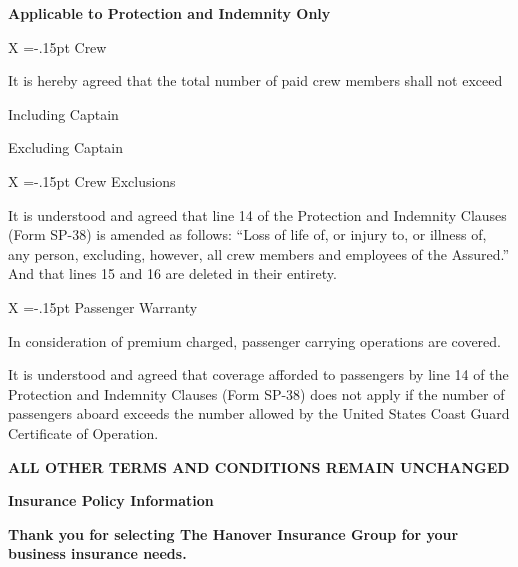 \documentclass[10pt]{article}
\newcommand{\remainunchanged} {
\mbox{}
\vfill
\begin{center}
  {\Large \textbf{ALL OTHER TERMS AND CONDITIONS REMAIN UNCHANGED}}
\end{center}
}
\newcommand{\mybox}{\fboxsep=-.15pt\fbox{\rule{0pt}{2.5ex}\rule{2.5ex}{0pt}}}
\newcommand{\checkbox}[2]{%
    \ifthenelse{\equal{#1}{#2}}  
            {X}               
            {\mybox}
}
\begin{document}
\vspace{\baselineskip}
\textbf{Applicable to Protection and Indemnity Only}

\vspace{\baselineskip}

\checkbox{} CCrew

\vspace{\baselineskip}

It is hereby agreed that the total number of paid crew members shall not exceed \fbox{ \phantom{textab} }

\vspace{\baselineskip}

\fbox{ \phantom{textab} } Including Captain

\vspace{\baselineskip}

\fbox{ \phantom{textab} } Excluding Captain

\vspace{\baselineskip}

\checkbox{} CCrew Exclusions

It is understood and agreed that line 14 of the Protection and Indemnity Clauses (Form SP-38) is amended as follows: “Loss of life of, or injury to, or illness of, any person, excluding, however, all crew members and employees of the Assured.” And that lines 15 and 16 are deleted in their entirety.

\vspace{\baselineskip}

\checkbox{} PPassenger Warranty

In consideration of premium charged, passenger carrying operations are covered.

\vspace{\baselineskip}

It is understood and agreed that coverage afforded to passengers by line 14 of the Protection and Indemnity Clauses (Form SP-38) does not apply if the number of passengers aboard exceeds the number allowed by the United States Coast Guard Certificate of Operation.

\remainunchanged
{}


\newpage
 \extramarks{}{} 
\noindent \textbf{\huge{Insurance Policy Information}} \newline

\hfill \break

\noindent \textbf{Thank you for selecting The Hanover Insurance Group for your business insurance needs.}
\end{document}
